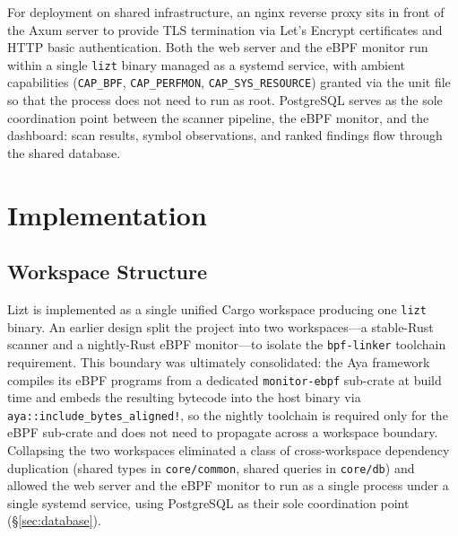 \documentclass[conference]{IEEEtran}
\begin{document}
For deployment on shared infrastructure, an nginx reverse proxy sits in front of the Axum server to provide TLS termination via Let's Encrypt certificates and HTTP basic authentication.
Both the web server and the eBPF monitor run within a single \texttt{lizt} binary managed as a systemd service, with ambient capabilities (\texttt{CAP\_BPF}, \texttt{CAP\_PERFMON}, \texttt{CAP\_SYS\_RESOURCE}) granted via the unit file so that the process does not need to run as root.
PostgreSQL serves as the sole coordination point between the scanner pipeline, the eBPF monitor, and the dashboard: scan results, symbol observations, and ranked findings flow through the shared database.



\section{Implementation}

\subsection{Workspace Structure}
\label{sec:workspace}

Lizt is implemented as a single unified Cargo workspace producing one \texttt{lizt} binary.
An earlier design split the project into two workspaces---a stable-Rust scanner and a nightly-Rust eBPF monitor---to isolate the \texttt{bpf-linker} toolchain requirement.
This boundary was ultimately consolidated: the Aya framework compiles its eBPF programs from a dedicated \texttt{monitor-ebpf} sub-crate at build time and embeds the resulting bytecode into the host binary via \texttt{aya::include\_bytes\_aligned!}, so the nightly toolchain is required only for the eBPF sub-crate and does not need to propagate across a workspace boundary.
Collapsing the two workspaces eliminated a class of cross-workspace dependency duplication (shared types in \texttt{core/common}, shared queries in \texttt{core/db}) and allowed the web server and the eBPF monitor to run as a single process under a single systemd service, using PostgreSQL as their sole coordination point (\S\ref{sec:database}).
\end{document}
